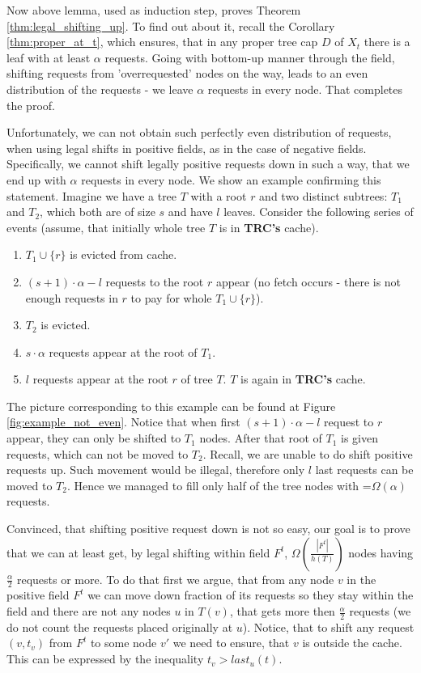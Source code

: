 Now above lemma, used as induction step, proves Theorem 
\ref{thm:legal_shifting_up}. To find out about it, recall the Corollary 
\ref{thm:proper_at_t}, which ensures, that in any proper tree cap $D$ of 
$X_t$ there is a leaf with at least $\alpha$ requests. Going with bottom-up 
manner through the field, shifting requests from 'overrequested' nodes on the 
way, leads to an even distribution of the requests - we leave $\alpha$ requests 
in every node. That completes the proof.   

Unfortunately, we can not obtain such perfectly even distribution of requests,
 when using legal shifts in positive fields, as in the case of negative fields. 
Specifically, we cannot shift legally positive requests down in such a way, that
 we end up with $\alpha$ requests in every node. We show an example confirming 
this statement. Imagine we have a tree $T$ with a root $r$ and two distinct 
subtrees: $T_1$ and $T_2$, which both are of size $s$ and have $l$ leaves. 
Consider the following series of events (assume, that initially whole tree $T$ 
is in \textbf{TRC's} cache).
\begin{enumerate}
 \item $T_1 \cup \{r\}$ is evicted from cache.
 \item $(s+1) \cdot \alpha - l$ requests to the root $r$ appear (no fetch 
occurs - there is not enough requests in $r$ to pay for whole $T_1 \cup \{r\}$).
 \item $T_2$ is evicted.
 \item $s \cdot \alpha$ requests appear at the root of $T_1$.
 \item $l$ requests appear at the root $r$ of tree $T$. $T$ is again in 
\textbf{TRC's} cache.
\end{enumerate}

The picture corresponding to this example can be found at Figure 
\ref{fig:example_not_even}. 
Notice that when first $(s+1) \cdot \alpha - l$ request to $r$ appear, they can 
only be shifted to $T_1$ nodes. After that root of $T_1$ is given requests, 
which can not be moved to $T_2$. Recall, we are unable to do shift positive 
requests up. Such movement would be illegal, therefore only $l$ last requests 
can be moved to $T_2$. Hence we managed to fill only half of the tree nodes 
with =$\Omega(\alpha)$ requests.   

Convinced, that shifting positive request down is not so easy, our goal is to 
prove that we can at least get, by legal shifting within field $F^t$, 
$\Omega(\frac{|F^t|}{h(T)})$ nodes having $\frac{\alpha}{2}$ 
requests or more. To do that first we argue, that from any node $v$ in the 
positive field $F^t$ we can move down fraction of its requests so they stay 
within the field and there are not any nodes $u$ in $T(v)$, that gets more then 
$\frac{\alpha}{2}$ requests (we do not count the requests placed originally at 
$u$). Notice, that to shift any request $(v, t_v)$ from $F^t$ to some node $v'$ 
we need to ensure, that $v$ is outside the cache. This can be expressed by 
the inequality $t_v > last_u(t)$.

